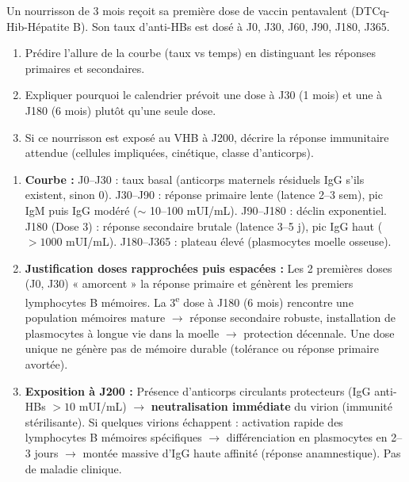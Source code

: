 \documentclass[11pt]{article}
\begin{document}
\begin{exercice}
Un nourrisson de 3 mois reçoit sa première dose de vaccin pentavalent (DTCq-Hib-Hépatite B). Son taux d'anti-HBs est dosé à J0, J30, J60, J90, J180, J365.
\begin{enumerate}
\item Prédire l'allure de la courbe (taux vs temps) en distinguant les réponses primaires et secondaires.
\item Expliquer pourquoi le calendrier prévoit une dose à J30 (1 mois) et une à J180 (6 mois) plutôt qu'une seule dose.
\item Si ce nourrisson est exposé au VHB à J200, décrire la réponse immunitaire attendue (cellules impliquées, cinétique, classe d'anticorps).
\end{enumerate}
\end{exercice}

\begin{corrige}
\begin{enumerate}
\item \textbf{Courbe :} J0--J30 : taux basal (anticorps maternels résiduels IgG s'ils existent, sinon 0). J30--J90 : réponse primaire lente (latence 2--3 sem), pic IgM puis IgG modéré ($\sim$ 10--100 mUI/mL). J90--J180 : déclin exponentiel. J180 (Dose 3) : réponse secondaire brutale (latence 3--5 j), pic IgG haut ($> 1000$ mUI/mL). J180--J365 : plateau élevé (plasmocytes moelle osseuse).
\item \textbf{Justification doses rapprochées puis espacées :} Les 2 premières doses (J0, J30) « amorcent » la réponse primaire et génèrent les premiers lymphocytes B mémoires. La 3\textsuperscript{e} dose à J180 (6 mois) rencontre une population mémoires mature $\rightarrow$ réponse secondaire robuste, installation de plasmocytes à longue vie dans la moelle $\rightarrow$ protection décennale. Une dose unique ne génère pas de mémoire durable (tolérance ou réponse primaire avortée).
\item \textbf{Exposition à J200 :} Présence d'anticorps circulants protecteurs (IgG anti-HBs $> 10$ mUI/mL) $\rightarrow$ \textbf{neutralisation immédiate} du virion (immunité stérilisante). Si quelques virions échappent : activation rapide des lymphocytes B mémoires spécifiques $\rightarrow$ différenciation en plasmocytes en 2--3 jours $\rightarrow$ montée massive d'IgG haute affinité (réponse anamnestique). Pas de maladie clinique.
\end{enumerate}
\end{corrige}
\end{document}
